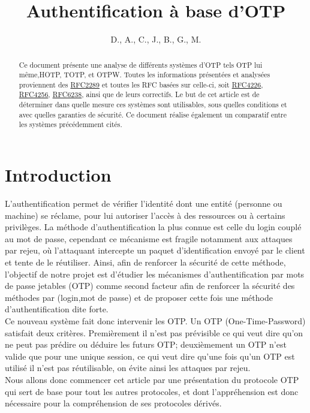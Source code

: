 \documentclass{../res/univ-projet}
\title{Authentification à base d'OTP}
\author{D.\bsc{Picard}, A.\bsc{Smondack}, C.\bsc{Hardouin}, J.\bsc{Tayewo}, B.\bsc{Zigh}, G.\bsc{Ferry}, M.\bsc{Michotte} }
\begin{document}
\maketitle

\begin{abstract}
Ce document présente une analyse de différents systèmes d'OTP tels \og{}OTP\fg{} lui même,\og{}HOTP\fg{}, \og{}TOTP\fg{},
et \og{}OTPW\fg{}. Toutes les informations présentées et analysées proviennent des \href{http://tools.ietf.org/html/rfc2289}{RFC2289} et 
toutes les RFC basées sur celle-ci, soit \href{http://tools.ietf.org/html/rfc4226}{RFC4226}, \href{http://tools.ietf.org/html/rfc4256}{RFC4256}, 
\href{http://tools.ietf.org/html/rfc6238}{RFC6238}, ainsi que de leurs correctifs. Le but de cet article est de déterminer dans quelle mesure 
ces systèmes sont utilisables, sous quelles conditions et avec quelles garanties de sécurité. Ce document réalise également un comparatif entre les 
systèmes précédemment cités.
\end{abstract}

\newpage
\tableofcontents
\newpage
\part{Introduction}
L'authentification permet de vérifier l'identité dont une entité (personne ou machine) se réclame, pour lui autoriser l'accès à des
ressources ou à certains privilèges. La méthode d'authentification la plus connue est celle du login couplé au mot de passe, cependant
ce mécanisme est fragile notamment aux attaques par rejeu, où l'attaquant intercepte un paquet d'identification envoyé par le client et tente de le réutiliser. Ainsi, afin de renforcer la sécurité de cette méthode, 
l'objectif de notre projet est d'étudier les mécanismes d'authentification par mots de passe jetables (OTP) comme second facteur afin de renforcer la sécurité
des méthodes par (login,mot de passe) et de proposer cette fois une méthode d'authentification dite forte.\\
Ce nouveau système fait donc intervenir les OTP. Un OTP (One-Time-Password) satisfait deux critères. Premièrement il n'est pas prévisible ce qui veut dire qu'on ne peut pas prédire 
ou déduire les futurs OTP; deuxièmement un OTP n'est valide que pour une unique session, ce qui veut dire qu'une fois qu'un OTP est utilisé il n'est pas réutilisable, on évite ainsi les
attaques par rejeu.\\
Nous allons donc commencer cet article par une présentation du protocole OTP qui sert de base pour tout les autres protocoles, et dont l'appréhension est donc nécessaire pour la compréhension
de ses protocoles dérivés.
\end{document}
